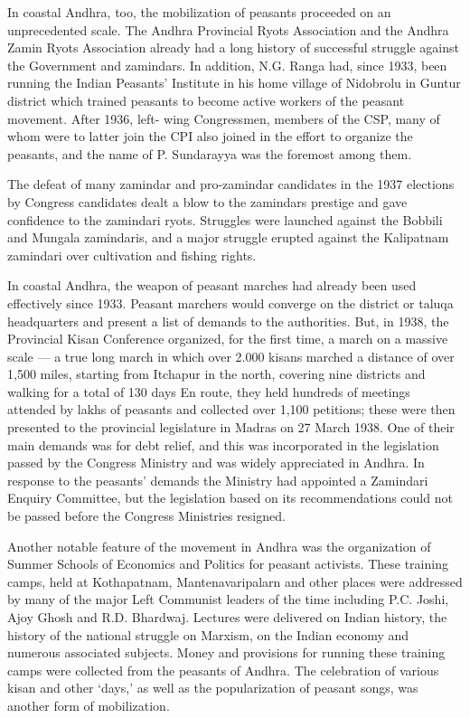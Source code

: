 In coastal Andhra, too, the mobilization of peasants proceeded on an unprecedented scale. The Andhra Provincial Ryots Association and the Andhra Zamin Ryots Association already had a long history of successful struggle against the Government and zamindars. In addition, N.G. Ranga had, since 1933, been running the Indian Peasants' Institute in his home village of Nidobrolu in Guntur district which trained peasants to become active workers of the peasant movement. After 1936, left- wing Congressmen, members of the CSP, many of whom were to latter join the CPI also joined in the effort to organize the peasants, and the name of P. Sundarayya was the foremost among them.

The defeat of many zamindar and pro-zamindar candidates in the 1937 elections by Congress candidates dealt a blow to the zamindars prestige and gave confidence to the zamindari ryots. Struggles were launched against the Bobbili and Mungala zamindaris, and a major struggle erupted against the Kalipatnam zamindari over cultivation and fishing rights.

In coastal Andhra, the weapon of peasant marches had already been used effectively since 1933. Peasant marchers would converge on the district or taluqa headquarters and present a list of demands to the authorities. But, in 1938, the Provincial Kisan Conference organized, for the first time, a march on a massive scale — a true long march in which over 2.000 kisans marched a distance of over 1,500 miles, starting from Itchapur in the north, covering nine districts and walking for a total of 130 days En route, they held hundreds of meetings attended by lakhs of peasants and collected over 1,100 petitions; these were then presented to the provincial legislature in Madras on 27 March 1938. One of their main demands was for debt relief, and this was incorporated in the legislation passed by the Congress Ministry and was widely appreciated in Andhra. In response to the peasants' demands the Ministry had appointed a Zamindari Enquiry Committee, but the legislation based on its recommendations could not be passed before the Congress Ministries resigned.

Another notable feature of the movement in Andhra was the organization of Summer Schools of Economics and Politics for peasant activists. These training camps, held at Kothapatnam, Mantenavaripalarn and other places were addressed by many of the major Left Communist leaders of the time including P.C. Joshi, Ajoy Ghosh and R.D. Bhardwaj. Lectures were delivered on Indian history, the history of the national struggle on Marxism, on the Indian economy and numerous associated subjects. Money and provisions for running these training camps were collected from the peasants of Andhra. The celebration of various kisan and other `days,' as well as the popularization of peasant songs, was another form of mobilization.

